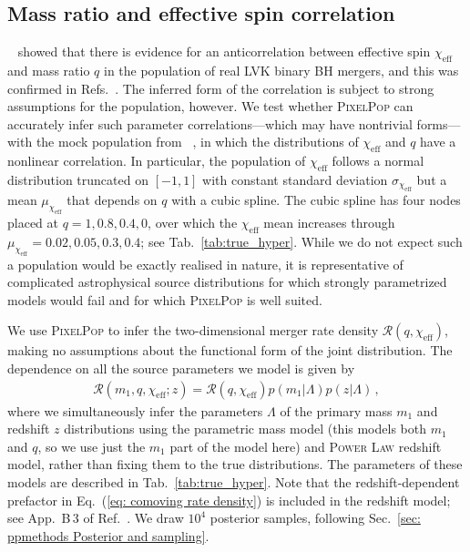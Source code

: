 \begin{refsection}
\subsection{Mass ratio and effective spin correlation}
\label{sec: ppmethods Mass ratio and effective spin correlation}

\citeauthor{Callister:2021fpo}~\cite{Callister:2021fpo} showed that there is evidence for an anticorrelation between effective spin $\chi_\mathrm{eff}$ and mass ratio $q$ in the population of real LVK binary BH mergers, and this was confirmed in Refs.~\cite{KAGRA:2021duu, Adamcewicz:2022hce, Adamcewicz:2023mov, Heinzel:2023hlb}. The inferred form of the correlation is subject to strong assumptions for the population, however. We test whether \textsc{PixelPop} can accurately infer such parameter correlations---which may have nontrivial forms---with the mock population from \citeauthor{Heinzel:2023hlb}~\cite{Heinzel:2023hlb}, in which the distributions of $\chi_\mathrm{eff}$ and $q$ have a nonlinear correlation. In particular, the population of $\chi_\mathrm{eff}$ follows a normal distribution truncated on $[-1,1]$ with constant standard deviation $\sigma_{\chi_\mathrm{eff}}$ but a mean $\mu_{\chi_\mathrm{eff}}$ that depends on $q$ with a cubic spline. The cubic spline has four nodes placed at $q = 1, 0.8, 0.4, 0$, over which the $\chi_\mathrm{eff}$ mean increases through $\mu_{\chi_\mathrm{eff}} = 0.02, 0.05, 0.3, 0.4$; see Tab.~\ref{tab:true_hyper}. While we do not expect such a population would be exactly realised in nature, it is representative of complicated astrophysical source distributions for which strongly parametrized models would fail and for which \textsc{PixelPop} is well suited.

We use \textsc{PixelPop} to infer the two-dimensional merger rate density $\mathcal{R}(q,\chi_\mathrm{eff})$, making no assumptions about the functional form of the joint distribution. The dependence on all the source parameters we model is given by
\begin{align}
\mathcal{R} ( m_1 , q , \chi_\mathrm{eff} ; z )
=
\mathcal{R} ( q, \chi_\mathrm{eff} )
p ( m_1 | \Lambda ) p( z | \Lambda)
\, ,
\label{eq: model q chieff}
\end{align}
where we simultaneously infer the parameters $\Lambda$ of the primary mass $m_1$ and redshift $z$ distributions using the parametric  mass model (this models both $m_1$ and $q$, so we use just the $m_1$ part of the model here) and \textsc{Power Law} redshift model, rather than fixing them to the true distributions. The parameters of these models are described in Tab.~\ref{tab:true_hyper}. Note that the redshift-dependent prefactor in Eq.~(\ref{eq: comoving rate density}) is included in the redshift model; see App.~{B\,3} of Ref.~\cite{KAGRA:2021duu}. We draw $10^4$ posterior samples, following Sec.~\ref{sec: ppmethods Posterior and sampling}.


\end{refsection}
